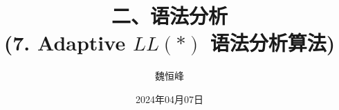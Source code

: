 \documentclass[]{beamer}
\title[语法分析]{二、语法分析 \\ (7. Adaptive $LL(\ast)$ 语法分析算法)}
\author[魏恒峰]{\large 魏恒峰}
\institute{hfwei@nju.edu.cn}
\date{2024年04月07日}
\begin{document}
\maketitle



% 


\thankyou{}

\end{document}
